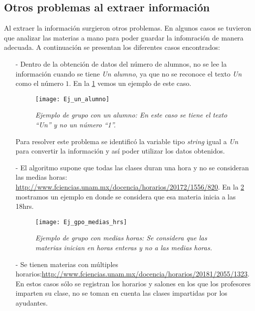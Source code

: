 \subsection{Otros problemas al extraer información}

Al extraer la información surgieron otros problemas. En algunos casos se tuvieron que analizar las materias a mano para poder guardar la infomración de manera adecuada. A continuación se presentan los diferentes casos encontrados:
  
  \begin{itemize}
\item[-] Dentro de la obtención de datos del número de alumnos, no se lee la información cuando se tiene \textit{Un alumno}, ya que no se reconoce el texto \textit{Un} como el número $1$. En la \figurename{\ref{UnAlumno}} vemos un ejemplo de este caso.

\begin{figure}[H]
\centering
\texttt{[image: Ej\_un\_alumno]} %
\caption[\textit{Ejemplo de grupo con un alumno}]{\textit{Ejemplo de grupo con un alumno: En este caso se tiene el texto ``Un'' y no un número ``1''.}}\label{UnAlumno}
\end{figure}

Para resolver este problema se identificó la variable tipo \textit{string} igual a \textit{Un} para convertir la información y así poder utilizar los datos obtenidos.

\item[-] El algoritmo supone que todas las clases duran una hora y no se consideran las medias horas: \url{http://www.fciencias.unam.mx/docencia/horarios/20172/1556/820}. En la \figurename{\ref{MediasHoras}} mostramos un ejemplo en donde se considera que esa materia inicia a las 18hrs.

\begin{figure}[H]
\centering
\texttt{[image: Ej\_gpo\_medias\_hrs]} %
\caption[\textit{Ejemplo de grupo con medias horas}]{\textit{Ejemplo de grupo con medias horas: Se considera que las materias inician en horas enteras y no a las medias horas.}}\label{MediasHoras}
\end{figure}

\item[-] Se tienen materias con múltiples horarios:\url{http://www.fciencias.unam.mx/docencia/horarios/20181/2055/1323}. En estos casos sólo se registran los horarios y salones en los que los profesores imparten su clase, no se toman en cuenta las clases impartidas por los ayudantes.


\end{itemize}

